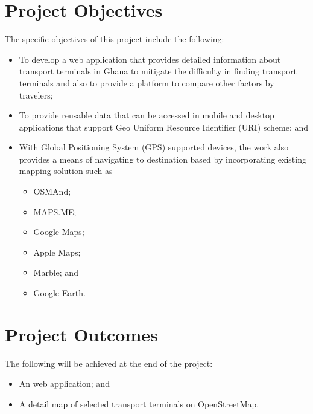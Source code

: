 \section{Project Objectives}
The specific objectives of this project include the following:
\begin{itemize}
	\item To develop a web application that provides detailed information about transport terminals in Ghana to mitigate the difficulty in finding transport terminals and also to provide a platform to compare other factors by travelers;
		\item To provide reusable data that can be accessed in mobile and desktop applications that support Geo Uniform Resource Identifier (URI) scheme; and
		\item With Global Positioning System (GPS) supported devices, the work also provides a means of navigating to destination based by incorporating existing mapping solution such as
	    \begin{itemize}[label=$\circ$]
		\item OSMAnd;
		\item MAPS.ME;
		\item Google Maps;
		\item Apple Maps;
		\item Marble; and
		\item Google Earth.
		\end{itemize}
\end{itemize}

\section{Project Outcomes}
The following will be achieved at the end of the project:
\begin{itemize}
	\item An web application; and
	\item A detail map of selected transport terminals on OpenStreetMap.
\end{itemize}

